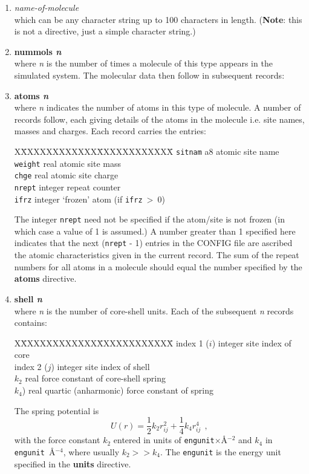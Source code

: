 \begin{enumerate}

\item {\em name-of-molecule} \\
which can be any character string up to 100 characters in length.
({\bf Note}: this is not a directive, just a simple character string.)

\item {\bf nummols {\em n}} \\
where {\em n} is the number of times a molecule of this type
appears in the simulated system.  The molecular data then follow
in subsequent records:

\item {\bf atoms {\em n}} \\
where {\em n} indicates the number of atoms in this type of
molecule.  A number of records follow, each giving details of the
atoms in the molecule i.e. site names, masses and charges.  Each
record carries the entries:
\begin{tabbing}
X\=XXXXXXXXXXXX\=XXXXXXXXXXXX\=\kill
\> {\tt sitnam} \> a8      \> atomic site name \\
\> {\tt weight} \> real    \> atomic site mass \\
\> {\tt chge}   \> real    \> atomic site charge \\
\> {\tt nrept}  \> integer \> repeat counter \\
\> {\tt ifrz}   \> integer \> `frozen' atom (if {\tt ifrz}$~>~0$)
\end{tabbing}
The integer {\tt nrept} need not be specified if the atom/site is
not frozen (in which case a value of 1 is assumed.)  A number
greater than 1 specified here indicates that the next ({\tt nrept}
- 1) entries in the CONFIG file are ascribed the atomic
characteristics given in the current record.  The sum of the
repeat numbers for all atoms in a molecule should equal the number
specified by the {\bf atoms} directive.

\item{\bf shell {\em n}} \\
where {\em n} is the number of core-shell units.  Each of the
subsequent {\em n} records contains:
\begin{tabbing}
X\=XXXXXXXXXXXX\=XXXXXXXXXXXX\=\kill
\> index 1 ($i$) \> integer \> site index of core \\
\> index 2 ($j$) \> integer \> site index of shell \\
\> $k_{2}$       \> real    \> force constant of core-shell spring \\
\> $k_{4}$)      \> real    \> quartic (anharmonic) force constant of spring
\end{tabbing}
The spring potential is
\begin{equation}
U(r)=\frac{1}{2}k_{2} r_{ij}^{2}+\frac{1}{4}k_{4} r_{ij}^{4}~~,
\end{equation}
with the force constant $k_{2}$ entered in units of {\tt engunit}$\times$\AA$^{-2}$
and $k_{4}$ in {\tt engunit}~\AA$^{-4}$, where usually $k_{2} >> k_{4}$.
The {\tt engunit} is the energy unit specified in the {\bf units} directive.


\end{enumerate}
